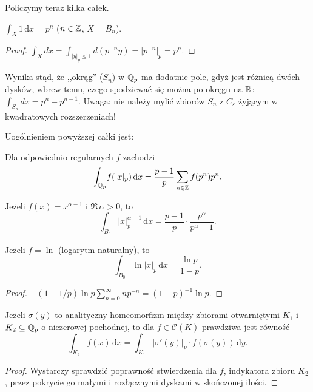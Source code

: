 Policzymy teraz kilka całek. %

\begin{przyklad}
	$\int_{X} \! 1 \,\textrm{d}x = p^n$ ($n \in \mathbb Z$, $X = B_n$).
\end{przyklad}

\begin{proof}$\int_X dx = \int_{|y|_p \le 1} d(p^{-n}y) = |p^{-n}|_p = p^n$.
\end{proof}

Wynika stąd, że ,,okrąg'' ($S_n$) w $\mathbb Q_p$ ma dodatnie pole, gdyż jest różnicą dwóch dysków, wbrew temu, czego spodziewać się można po okręgu na $\mathbb R$: $\int_{S_n} dx = p^n - p^{n-1}$.
Uwaga: nie należy mylić zbiorów $S_n$ z $C_\varepsilon$ żyjącym w kwadratowych rozszerzeniach!

Uogólnieniem powyższej całki jest:

\begin{fakt}
	Dla odpowiednio regularnych $f$ zachodzi
	\[
		\int_{\mathbb Q_p} \! f(|x|_p) \,\textrm{d}x = \frac{p-1}{p} \sum_{n \in \mathbb Z} f(p^n) p^n.
	\]
\end{fakt}

\begin{wniosek}
	Jeżeli $f (x) = x^{\alpha - 1}$ i $\Re \, \alpha > 0$, to
	\[
		\int_{B_0} |x|_p^{\alpha - 1} \, \textrm{d} x = \frac{p-1}{p} \cdot \frac{p^\alpha}{p^\alpha - 1}.
	\]
\end{wniosek}

\begin{wniosek}
	Jeżeli $f = \ln$ (logarytm naturalny), to 
	\[
		\int_{B_0} \ln |x|_p \, \textrm{d} x = \frac{\ln p}{1 - p}.
	\]
\end{wniosek}

\begin{proof}
	$- (1 - 1/p)\ln p \sum_{n = 0}^\infty n{p^{-n}} = (1-p)^{-1} \ln p$.
\end{proof}

\begin{fakt}
	Jeżeli $\sigma(y)$ to analityczny homeomorfizm między zbiorami otwarniętymi $K_1$ i $K_2 \subseteq \mathbb Q_p$ o niezerowej pochodnej, to dla $f \in \mathcal C(K)$ prawdziwa jest równość
	\[
		\int_{K_2} \!f(x)\,\textrm{d}x = \int_{K_1}\! |\sigma'(y)|_p \cdot f(\sigma(y)) \,\textrm{d}y.
	\]
\end{fakt}

\begin{proof}
	Wystarczy sprawdzić poprawność stwierdzenia dla $f$, indykatora zbioru $K_2$, przez pokrycie go małymi i rozłącznymi dyskami w skończonej ilości.
\end{proof}

